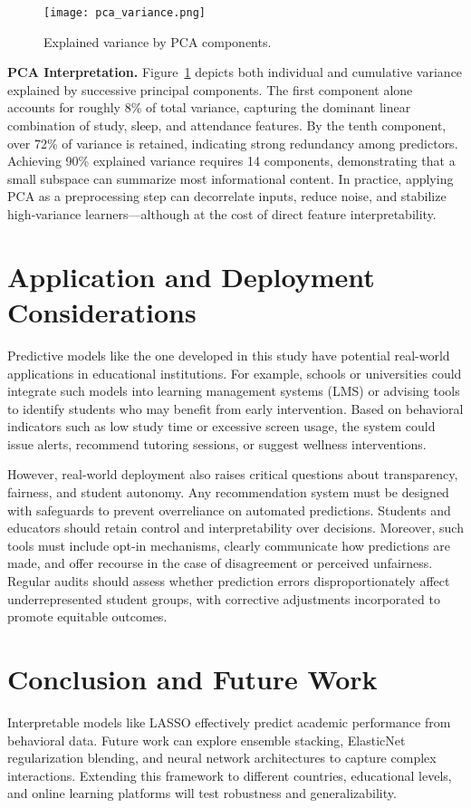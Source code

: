 \documentclass[conference]{IEEEtran}
\begin{document}
\begin{figure}[htbp]
  \centering
  \texttt{[image: pca\_variance.png]}
  \caption{Explained variance by PCA components.}
  \label{fig:pca}
\end{figure}
\noindent\textbf{PCA Interpretation.}
Figure~\ref{fig:pca} depicts both individual and cumulative variance explained by successive principal components. The first component alone accounts for roughly 8\% of total variance, capturing the dominant linear combination of study, sleep, and attendance features. By the tenth component, over 72\% of variance is retained, indicating strong redundancy among predictors. Achieving 90\% explained variance requires 14 components, demonstrating that a small subspace can summarize most informational content. In practice, applying PCA as a preprocessing step can decorrelate inputs, reduce noise, and stabilize high‐variance learners—although at the cost of direct feature interpretability.

\section{Application and Deployment Considerations}
Predictive models like the one developed in this study have potential real-world applications in educational institutions. For example, schools or universities could integrate such models into learning management systems (LMS) or advising tools to identify students who may benefit from early intervention. Based on behavioral indicators such as low study time or excessive screen usage, the system could issue alerts, recommend tutoring sessions, or suggest wellness interventions.

However, real-world deployment also raises critical questions about transparency, fairness, and student autonomy. Any recommendation system must be designed with safeguards to prevent overreliance on automated predictions. Students and educators should retain control and interpretability over decisions. Moreover, such tools must include opt-in mechanisms, clearly communicate how predictions are made, and offer recourse in the case of disagreement or perceived unfairness. Regular audits should assess whether prediction errors disproportionately affect underrepresented student groups, with corrective adjustments incorporated to promote equitable outcomes.

\section{Conclusion and Future Work}
Interpretable models like LASSO effectively predict academic performance from behavioral data. Future work can explore ensemble stacking, ElasticNet regularization blending, and neural network architectures to capture complex interactions. Extending this framework to different countries, educational levels, and online learning platforms will test robustness and generalizability.
\end{document}
